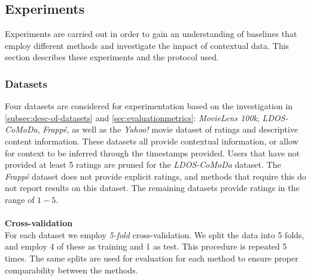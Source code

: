\subsection{Experiments}
Experiments are carried out in order to gain an understanding of baselines that employ different methods and investigate the impact of contextual data.
This section describes these experiments and the protocol used.

\subsubsection{Datasets}
Four datasets are considered for experimentation based on the investigation in \autoref{subsec:desc-of-datasets} and \autoref{sec:evaluationmetrics}: \textit{MovieLens 100k}, \textit{LDOS-CoMoDa}, \textit{Frappé}, as well as the \textit{Yahoo!} movie dataset of ratings and descriptive content information\cite{yahoo-movie}.
These datasets all provide contextual information, or allow for context to be inferred through the timestamps provided.
Users that have not provided at least 5 ratings are pruned for the \textit{LDOS-CoMoDa} dataset.
The \textit{Frappé} dataset does not provide explicit ratings, and methods that require this do not report results on this dataset.
The remaining datasets provide ratings in the range of $1-5$.
\\\\
\textbf{Cross-validation}\\
For each dataset we employ \textit{5-fold} cross-validation.
We split the data into 5 folds, and employ 4 of these as training and 1 as test.
This procedure is repeated 5 times.
The same splits are used for evaluation for each method to ensure proper comparability between the methods.

